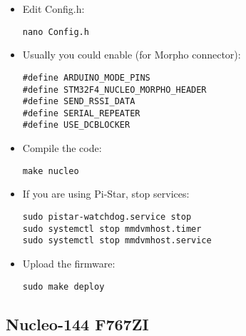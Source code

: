 \documentclass[]{article}
\begin{document}
\begin{itemize}[leftmargin=*]
\item Edit Config.h:

\begin{lstlisting}[style=DOS]
nano Config.h
\end{lstlisting}

\item Usually you could enable (for Morpho connector):

\begin{verbatim}
#define ARDUINO_MODE_PINS
#define STM32F4_NUCLEO_MORPHO_HEADER
#define SEND_RSSI_DATA
#define SERIAL_REPEATER
#define USE_DCBLOCKER
\end{verbatim}

\item Compile the code:

\begin{lstlisting}[style=DOS]
make nucleo
\end{lstlisting}

\item If you are using Pi-Star, stop services:

\begin{lstlisting}[style=DOS]
sudo pistar-watchdog.service stop
sudo systemctl stop mmdvmhost.timer
sudo systemctl stop mmdvmhost.service
\end{lstlisting}

\item Upload the firmware:

\begin{lstlisting}[style=DOS]
sudo make deploy
\end{lstlisting}

\end{itemize}

\subsection{Nucleo-144 F767ZI}
\end{document}
